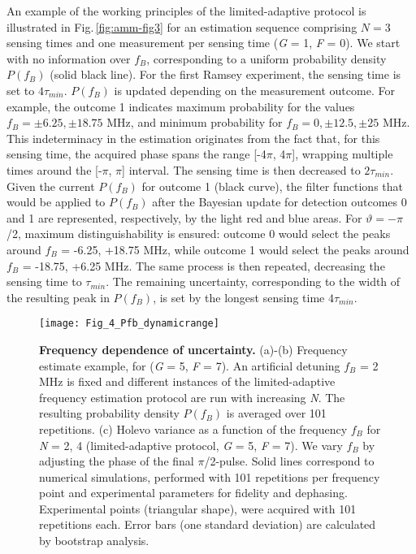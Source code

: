 An example of the working principles of the limited-adaptive protocol is illustrated in Fig.\,\ref{fig:amm-fig3} for an estimation sequence comprising $N = 3$ sensing times and one measurement per sensing time (\textit{G} = 1, \textit{F} = 0). We start with no information over $f_B$, corresponding to a uniform probability density $P(f_B )$ (solid black line).  For the first Ramsey experiment, the sensing time is set to $4 \tau_{min}$. $P(f_B)$ is updated depending on the measurement outcome. For example, the outcome 1 indicates maximum probability for the values $f_B = \pm 6.25, \pm 18.75$ MHz, and minimum probability for $f_B = 0, \pm 12.5, \pm 25$ MHz. This indeterminacy in the estimation originates from the fact that, for this sensing time, the acquired phase spans the range [-4$\pi$, 4$\pi$], wrapping multiple times around the [-$\pi$, $\pi$] interval. The sensing time is then decreased to $2 \tau_{min}$. Given the current $P(f_B)$ for outcome 1 (black curve), the filter functions that would be applied to $P(f_B)$ after the Bayesian update for detection outcomes 0 and 1 are represented, respectively, by the light red and blue areas. For $\vartheta = - \pi$/2, maximum distinguishability is ensured: outcome 0 would select the peaks around $f_B$ = -6.25, +18.75 MHz, while outcome 1 would select the peaks around $f_B$ = -18.75, +6.25 MHz. The same process is then repeated, decreasing the sensing time to  $\tau_{min}$. The remaining uncertainty, corresponding to the width of the resulting peak in $P(f_B)$, is set by the longest sensing time $4 \tau_{min}$. 

\begin{figure*}
	\centering
	\texttt{[image: Fig\_4\_Pfb\_dynamicrange]}
	\caption{\label{fig:amm-fig4} \textbf{Frequency dependence of uncertainty.} (a)-(b) Frequency estimate example, for (\textit{G} =  5, \textit{F} = 7). An artificial detuning $f_B$ = 2 MHz is fixed and different instances of the limited-adaptive frequency estimation protocol are run with increasing \textit{N}. The resulting probability density $P(f_B)$ is averaged over 101 repetitions. (c) Holevo variance as a function of the frequency $f_B$ for \textit{N} = 2, 4 (limited-adaptive protocol, \textit{G} = 5, \textit{F} = 7). We vary $f_B$ by adjusting the phase of the final $\pi$/2-pulse. Solid lines correspond to numerical simulations, performed with 101 repetitions per frequency point and experimental parameters for fidelity and dephasing. Experimental points (triangular shape), were acquired with 101 repetitions each. Error bars (one standard deviation) are calculated by bootstrap analysis.}
\end{figure*}

